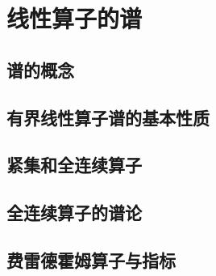\chapter{线性算子的谱}
\section{谱的概念}\label{sec:5.1}


\section{有界线性算子谱的基本性质}\label{sec:5.2}

\section{紧集和全连续算子}\label{sec:5.3}


\section{全连续算子的谱论}\label{sec:5.4}

\section{费雷德霍姆算子与指标}\label{sec:5.5}


